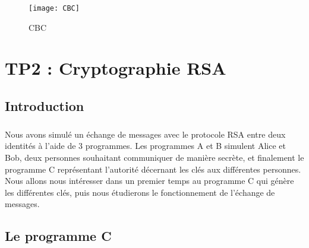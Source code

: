 \documentclass[11pt,fleqn]{book} %
\begin{document}
\begin{figure}[h]
\centering\texttt{[image: CBC]}
\caption{CBC}
\end{figure}


\chapter{TP2 : Cryptographie RSA}


\section{Introduction}

\paragraph{}Nous avons simulé un échange de messages avec le protocole RSA entre deux identités à l'aide de 3 programmes. Les programmes A et B simulent Alice et Bob, deux personnes souhaitant communiquer de manière secrète, et finalement le programme C représentant l'autorité décernant les clés aux différentes personnes. Nous allons nous intéresser dans un premier temps au programme C qui génère les différentes clés, puis nous étudierons le fonctionnement de l'échange de messages.


\section{Le programme C}
\end{document}
